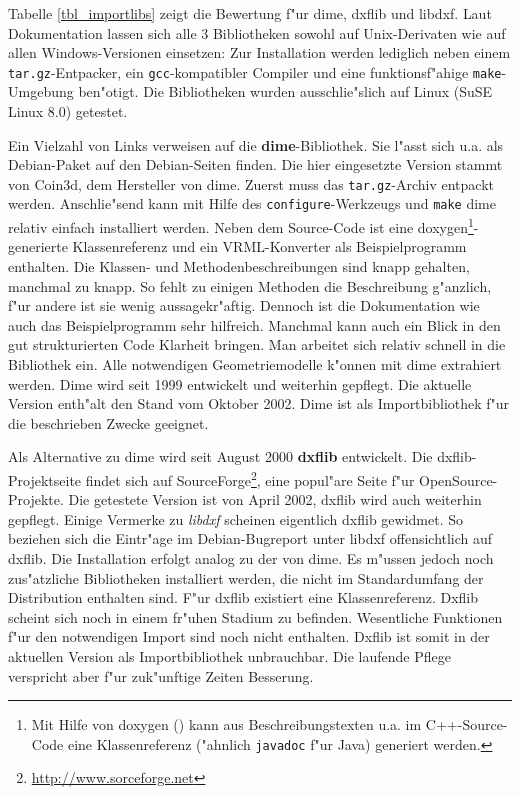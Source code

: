 Tabelle \ref{tbl_importlibs} zeigt die Bewertung f"ur dime, dxflib und libdxf.
Laut Dokumentation lassen sich alle 3 Bibliotheken sowohl auf Unix-Derivaten
wie auf allen Windows-Versionen einsetzen: Zur Installation werden lediglich 
neben einem \texttt{tar.gz}-Entpacker, ein \texttt{gcc}-kompatibler Compiler 
und eine funktionsf"ahige \texttt{make}-Umgebung ben"otigt. Die Bibliotheken 
wurden ausschlie"slich auf Linux (SuSE Linux 8.0) getestet.

Ein Vielzahl von Links verweisen auf die \textbf{dime}-Bibliothek. Sie 
l"asst sich u.a. als Debian-Paket auf den Debian-Seiten finden. Die hier 
eingesetzte Version stammt von Coin3d, dem Hersteller von dime. Zuerst muss 
das \texttt{tar.gz}-Archiv entpackt werden. Anschlie"send kann mit Hilfe des 
\texttt{configure}-Werkzeugs und \texttt{make} dime relativ einfach 
installiert werden. Neben dem Source-Code ist eine doxygen\footnote{Mit Hilfe 
von doxygen (\cite{doxygen}) kann aus Beschreibungstexten u.a. im 
C++-Source-Code eine Klassenreferenz ("ahnlich \texttt{javadoc} f"ur Java) 
generiert werden.}-generierte 
Klassenreferenz und ein VRML-Konverter als Beispielprogramm enthalten.
Die Klassen- und Methodenbeschreibungen sind knapp gehalten, manchmal 
zu knapp. So fehlt zu einigen Methoden die Beschreibung g"anzlich, f"ur 
andere ist sie wenig aussagekr"aftig. Dennoch ist die Dokumentation wie auch 
das Beispielprogramm sehr hilfreich. Manchmal kann auch ein Blick in 
den gut strukturierten Code Klarheit bringen. Man arbeitet sich relativ 
schnell in die Bibliothek ein. Alle notwendigen Geometriemodelle k"onnen 
mit dime extrahiert werden. Dime wird seit 1999 entwickelt und weiterhin 
gepflegt. Die aktuelle Version enth"alt den Stand vom Oktober 2002. Dime 
ist als Importbibliothek f"ur die beschrieben Zwecke geeignet.

Als Alternative zu dime wird seit August 2000 \textbf{dxflib} entwickelt.
Die dxflib-Projektseite findet sich auf 
SourceForge\footnote{\url{http://www.sorceforge.net}}, eine popul"are Seite 
f"ur OpenSource-Projekte. Die getestete Version ist von April 2002, dxflib 
wird auch weiterhin gepflegt. Einige Vermerke zu \emph{libdxf} scheinen 
eigentlich dxflib gewidmet. So beziehen sich die Eintr"age im 
Debian-Bugreport unter libdxf offensichtlich auf dxflib. 
Die Installation erfolgt analog zu der von dime. Es m"ussen jedoch 
noch zus"atzliche Bibliotheken installiert werden, die nicht im Standardumfang 
der Distribution enthalten sind. F"ur dxflib existiert eine Klassenreferenz.
Dxflib scheint sich noch in einem fr"uhen Stadium zu befinden. 
Wesentliche Funktionen f"ur den notwendigen Import 
sind noch nicht enthalten. Dxflib ist somit in der aktuellen Version als 
Importbibliothek unbrauchbar. Die laufende Pflege verspricht aber f"ur 
zuk"unftige Zeiten Besserung.

